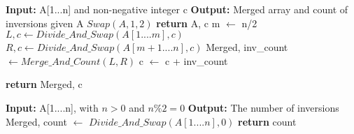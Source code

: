 \documentclass{article}
\begin{document}
\begin{algorithm}
      \begin{algorithmic}[1]
      
    \State \textbf{Input:} A[1...n] and non-negative integer c
    \State \textbf{Output:} Merged array and count of inversions given A
                \State $Swap(A,1,2)$
                 \State \textbf{return} A, c
            \EndIf
        \Else
            \State m $\leftarrow$ n/2
            \State $L, c \leftarrow Divide\_And\_Swap(A[1....m], c)$
            \State $R, c \leftarrow Divide\_And\_Swap(A[m+1....n], c)$
        \EndIf
            \State Merged, inv\_count $\leftarrow Merge\_And\_Count(L,R)$
            \State c $\leftarrow$ c + inv\_count
        
        \State \textbf{return} Merged, c
    \EndProcedure
    
   \end{algorithmic}
\end{algorithm}
  \begin{algorithm}
      \begin{algorithmic}[1]
      
    \State \textbf{Input:} A[1....n], with $n > 0$ and $n \% 2 = 0$
    \State \textbf{Output:} The number of inversions
        \State Merged, count $\leftarrow$ $Divide\_And\_Swap(A[1....n], 0)$
        \State \textbf{return}  count
    
    \EndProcedure
       \end{algorithmic}
\end{algorithm}
    
\end{document}
